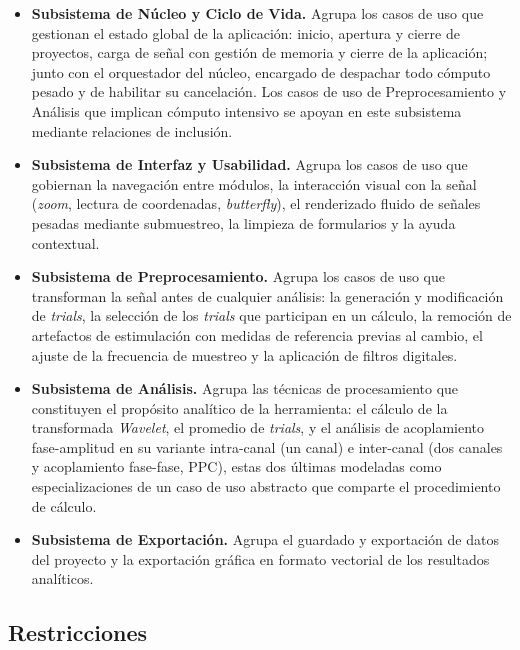 \documentclass[12pt,letterpaper,oneside]{article}
\begin{document}
\begin{itemize}
    \item \textbf{Subsistema de Núcleo y Ciclo de Vida.} Agrupa los casos de uso que gestionan el estado global de la aplicación: inicio, apertura y cierre de proyectos, carga de señal con gestión de memoria y cierre de la aplicación; junto con el orquestador del núcleo, encargado de despachar todo cómputo pesado y de habilitar su cancelación. Los casos de uso de Preprocesamiento y Análisis que implican cómputo intensivo se apoyan en este subsistema mediante relaciones de inclusión.

    \item \textbf{Subsistema de Interfaz y Usabilidad.} Agrupa los casos de uso que gobiernan la navegación entre módulos, la interacción visual con la señal (\textit{zoom}, lectura de coordenadas, \textit{butterfly}), el renderizado fluido de señales pesadas mediante submuestreo, la limpieza de formularios y la ayuda contextual.

    \item \textbf{Subsistema de Preprocesamiento.} Agrupa los casos de uso que transforman la señal antes de cualquier análisis: la generación y modificación de \textit{trials}, la selección de los \textit{trials} que participan en un cálculo, la remoción de artefactos de estimulación con medidas de referencia previas al cambio, el ajuste de la frecuencia de muestreo y la aplicación de filtros digitales.

    \item \textbf{Subsistema de Análisis.} Agrupa las técnicas de procesamiento que constituyen el propósito analítico de la herramienta: el cálculo de la transformada \textit{Wavelet}, el promedio de \textit{trials}, y el análisis de acoplamiento fase-amplitud en su variante intra-canal (un canal) e inter-canal (dos canales y acoplamiento fase-fase, PPC), estas dos últimas modeladas como especializaciones de un caso de uso abstracto que comparte el procedimiento de cálculo.

    \item \textbf{Subsistema de Exportación.} Agrupa el guardado y exportación de datos del proyecto y la exportación gráfica en formato vectorial de los resultados analíticos.
\end{itemize}


\subsection{Restricciones}
\end{document}
